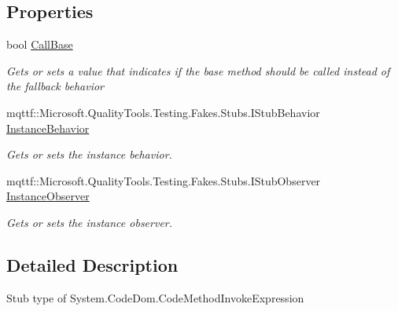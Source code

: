 \subsection*{Properties}
\begin{DoxyCompactItemize}
\item 
bool \hyperlink{class_system_1_1_code_dom_1_1_fakes_1_1_stub_code_method_invoke_expression_ac2cdf27efffb3440eb846a98dfabf6d2}{Call\-Base}
\begin{DoxyCompactList}\small\item\em Gets or sets a value that indicates if the base method should be called instead of the fallback behavior\end{DoxyCompactList}\item 
mqttf\-::\-Microsoft.\-Quality\-Tools.\-Testing.\-Fakes.\-Stubs.\-I\-Stub\-Behavior \hyperlink{class_system_1_1_code_dom_1_1_fakes_1_1_stub_code_method_invoke_expression_a9badb6f29138e18f58863a361d3f5277}{Instance\-Behavior}
\begin{DoxyCompactList}\small\item\em Gets or sets the instance behavior.\end{DoxyCompactList}\item 
mqttf\-::\-Microsoft.\-Quality\-Tools.\-Testing.\-Fakes.\-Stubs.\-I\-Stub\-Observer \hyperlink{class_system_1_1_code_dom_1_1_fakes_1_1_stub_code_method_invoke_expression_a21fa18cf02868f53f65d2469f395eb7d}{Instance\-Observer}
\begin{DoxyCompactList}\small\item\em Gets or sets the instance observer.\end{DoxyCompactList}\end{DoxyCompactItemize}


\subsection{Detailed Description}
Stub type of System.\-Code\-Dom.\-Code\-Method\-Invoke\-Expression



